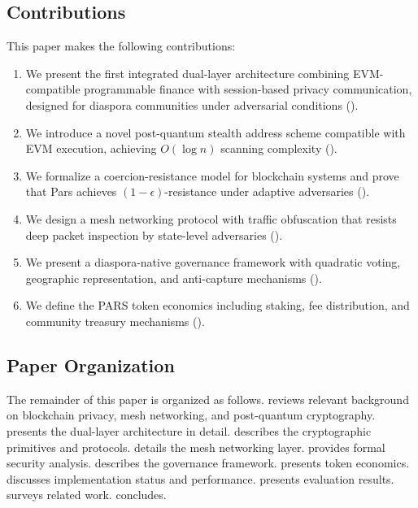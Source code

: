 \documentclass[11pt,a4paper,twocolumn]{article}
\begin{document}
\subsection{Contributions}

This paper makes the following contributions:

\begin{enumerate}[leftmargin=*]
  \item We present the first integrated dual-layer architecture combining EVM-compatible programmable finance with session-based privacy communication, designed for diaspora communities under adversarial conditions ().
  \item We introduce a novel post-quantum stealth address scheme compatible with EVM execution, achieving $O(\log n)$ scanning complexity ().
  \item We formalize a coercion-resistance model for blockchain systems and prove that Pars achieves $(1-\epsilon)$-resistance under adaptive adversaries ().
  \item We design a mesh networking protocol with traffic obfuscation that resists deep packet inspection by state-level adversaries ().
  \item We present a diaspora-native governance framework with quadratic voting, geographic representation, and anti-capture mechanisms ().
  \item We define the PARS token economics including staking, fee distribution, and community treasury mechanisms ().
\end{enumerate}

\subsection{Paper Organization}

The remainder of this paper is organized as follows.  reviews relevant background on blockchain privacy, mesh networking, and post-quantum cryptography.  presents the dual-layer architecture in detail.  describes the cryptographic primitives and protocols.  details the mesh networking layer.  provides formal security analysis.  describes the governance framework.  presents token economics.  discusses implementation status and performance.  presents evaluation results.  surveys related work.  concludes.
\end{document}
